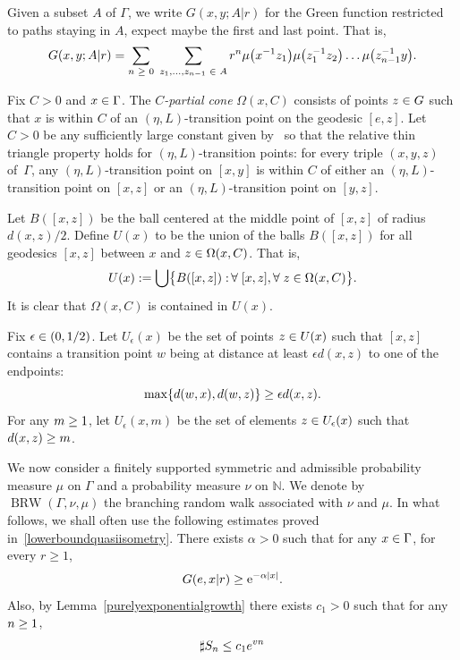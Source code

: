 \documentclass[AHL,Unicode,longabstracts]{cedram}
\newcommand\bbN{\mathbb{N}}
\newcommand{\rme}{\mathrm{e}}
\DeclareMathOperator{\BRW}{BRW}
\let\originalleft\left
\let\originalright\right
\renewcommand{\left}{\mathopen{}\mathclose\bgroup\originalleft}
\renewcommand{\right}{\aftergroup\egroup\originalright}
\let\oldin\in
\renewcommand{\in}{\mathchoice{\oldin}{\oldin}{\,\oldin\,}{\,\oldin\,}}
\let\oldge\ge
\renewcommand{\ge}{\mathchoice{\oldge}{\oldge}{\,\oldge\,}{\,\oldge\,}}
\let\oldle\le
\renewcommand{\le}{\mathchoice{\oldle}{\oldle}{\,\oldle\,}{\,\oldle\,}}
\let\oldforall\forall
\renewcommand*{\forall}{\mathrel{\oldforall}}
\begin{document}
Given a subset $A$ of $\Gamma$, we write $G(x,y;A|r)$ for the Green function restricted to paths staying in $A$, expect maybe the first and last point. That is,
\[
G(x,y;A|r)=\sum_{n\ge 0}\;\sum_{z_1,\dots,z_{n-1}\in A}r^n\mu\left(x^{-1}z_1\right)\mu\left(z_1^{-1}z_2\right)\dots\mu\left(z_{n-1}^{-1}y\right).
\]

Fix $C>0$ and $x\in \Gamma$. The \emph{$C$-partial cone} $\Omega(x,C)$ consists of points $z\in G$ such that $x$ is within $C$ of an $(\eta, L)$-transition point on the geodesic $[e,z]$. Let $C>0$ be any sufficiently large constant given by~\cite[Lemma~2.9]{DWY} so that the relative thin triangle property holds for $(\eta, L)$-transition points: for every triple $(x,y,z)$ of~$\Gamma$, any $(\eta,L)$-transition point on $[x,y]$ is within $C$ of either an $(\eta,L)$-transition point on $[x,z]$ or an $(\eta,L)$-transition point on $[y,z]$.

Let $B([x,z])$ be the ball centered at the middle point of $[x,z]$ of radius ${d(x,z)/2}$. Define $U(x)$ to be the union of the balls $B([x,z])$ for all geodesics $[x,z]$ between $x$ and $z\in \Omega(x,C)$. That is,
\[
U(x):= \bigcup\bigl\{B([x,z]):\, \forall [x,z], \forall z\in \Omega(x,C)\bigr\}.
\]
It is clear that $\Omega(x, C)$ is contained in $U(x)$.

Fix $\epsilon\in (0, 1/2)$.
Let $U_\epsilon(x)$ be the set of points $z\in U(x)$ such that $[x,z]$ contains a transition point $w$ being at distance at least $\epsilon d(x,z)$ to one of the endpoints:
\[
\max\{d(w, x), d(w,z)\}\ge \epsilon d(x,z).
\]
For any $m\ge 1$, let $U_{\epsilon}(x,m)$ be the set of elements $z\in U_{\epsilon}(x)$ such that $d(x,z)\ge m$.


We now consider a finitely supported symmetric and admissible probability measure $\mu$ on $\Gamma$ and a probability measure $\nu$ on $\bbN$. We denote by $\BRW(\Gamma,\nu,\mu)$ the branching random walk associated with $\nu$ and $\mu$. In what follows, we shall often use the following estimates proved in~\eqref{lowerboundquasiisometry}. There exists $\alpha>0$ such that for any $x\in \Gamma$, for every $r\geq 1$,
\begin{align}\label{GrLBD}
G(e, x|r)\ge \rme^{-\alpha |x|}.
\end{align}
Also, by Lemma~\ref{purelyexponentialgrowth} there exists $c_1>0$ such that for any $n\ge 1$,
\begin{align}\label{SnGrowth}
\sharp S_n\le c_1 e^{vn}
\end{align}
\end{document}
